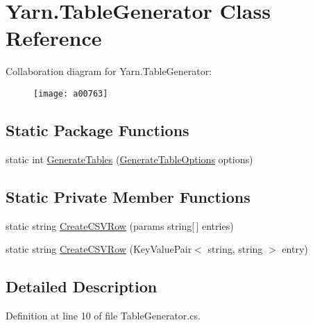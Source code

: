 \hypertarget{a00169}{\section{Yarn.\-Table\-Generator Class Reference}
\label{a00169}
}


Collaboration diagram for Yarn.\-Table\-Generator\-:
\nopagebreak
\begin{figure}[H]
\begin{center}
\leavevmode
\texttt{[image: a00763]}
\end{center}
\end{figure}
\subsection*{Static Package Functions}
\begin{DoxyCompactItemize}
\item 
static int \hyperlink{a00169_a1d65ef643c3f3495cf9480f86172ff87}{Generate\-Tables} (\hyperlink{a00107}{Generate\-Table\-Options} options)
\end{DoxyCompactItemize}
\subsection*{Static Private Member Functions}
\begin{DoxyCompactItemize}
\item 
static string \hyperlink{a00169_ac03637d16d3512258c997b9a21af6c42}{Create\-C\-S\-V\-Row} (params string\mbox{[}$\,$\mbox{]} entries)
\item 
static string \hyperlink{a00169_aa16da6b6810ce3a5fd2a7920de6322ef}{Create\-C\-S\-V\-Row} (Key\-Value\-Pair$<$ string, string $>$ entry)
\end{DoxyCompactItemize}


\subsection{Detailed Description}


Definition at line 10 of file Table\-Generator.\-cs.



